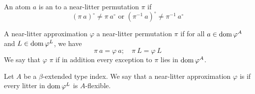 \begin{definition}
    An atom \( a \) is an  to a near-litter permutation \( \pi \) if
    \[ (\pi\ a)^\circ \neq \pi\ a^\circ \text{ or } (\pi^{-1}\ a)^\circ \neq \pi^{-1}\ a^\circ \]
\end{definition}
\begin{definition}
    A near-litter approximation \( \varphi \)  a near-litter permutation \( \pi \) if for all \( a \in \operatorname{dom} \varphi^A \) and \( L \in \operatorname{dom} \varphi^L \), we have
    \[ \pi\ a = \varphi\ a;\quad \pi\ L = \varphi\ L \]
    We say that \( \varphi \)  \( \pi \) if in addition every exception to \( \pi \) lies in \( \operatorname{dom} \varphi^A \).
\end{definition}
\begin{definition}
    Let \( A \) be a \( \beta \)-extended type index.
    We say that a near-litter approximation \( \varphi \) is  if every litter in \( \operatorname{dom} \varphi^L \) is \( A \)-flexible.
\end{definition}
